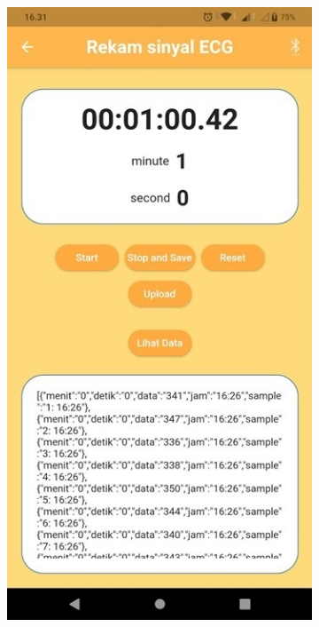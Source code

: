\begin{figure}[!h] \centering
	\begin{subfigure}{0.45\textwidth}
		\centering
		\includegraphics[width=1\linewidth]{img/percob/Slide13a}	  
		\caption{}		
	\end{subfigure}

\end{figure}
